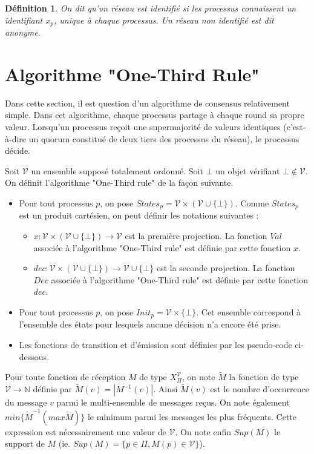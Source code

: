 \documentclass{article}
\newtheorem{definition}{Définition}
\begin{document}
\begin{definition}
	On dit qu'un réseau est \textit{identifié} si les processus connaissent un identifiant $x_p$, unique à chaque processus.
	Un réseau non identifié est dit \textit{anonyme}.
\end{definition}

\section{Algorithme "One-Third Rule"}

Dans cette section, il est question d'un algorithme de consensus relativement simple. Dans cet algorithme, chaque processus partage à chaque round sa propre valeur.
Lorsqu'un processus reçoit une supermajorité de valeurs identiques (c'est-à-dire un quorum constitué de deux tiers des processus du réseau), le processus décide.

Soit $\mathcal{V}$ un ensemble supposé totalement ordonné. Soit $\bot$ un objet vérifiant $\bot \notin \mathcal{V}$.
On définit l'algorithme "One-Third rule" de la façon suivante.
\begin{itemize}
	\item Pour tout processus $p$, on pose $States_p = \mathcal{V} \times (\mathcal{V} \cup \{ \bot \})$.
	Comme $States_p$ est un produit cartésien, on peut définir les notations suivantes :
	\begin{itemize}

		\item $x : \mathcal{V} \times (\mathcal{V} \cup \{ \bot \}) \rightarrow \mathcal{V}$ est la première projection.
			La fonction $Val$ associée à l'algorithme "One-Third rule" est définie par cette fonction $x$.
		\item $dec : \mathcal{V} \times (\mathcal{V} \cup \{ \bot \}) \rightarrow \mathcal{V} \cup \{\bot\}$ est la seconde projection.
			La fonction $Dec$ associée à l'algorithme "One-Third rule" est définie par cette fonction $dec$.

	\end{itemize}
\item Pour tout processus $p$, on pose $Init_p = \mathcal{V} \times \{ \bot \}$. Cet ensemble correspond à l'ensemble des états pour lesquels aucune décision n'a encore été prise.
\item Les fonctions de transition et d'émission sont définies par les pseudo-code ci-dessous.
\end{itemize}
Pour toute fonction de réception $M$ de type $X_\Pi^\mathcal{V}$, on note $\widetilde{M}$ la fonction de type $\mathcal{V} \rightarrow \mathds{N}$ définie par $\widetilde{M}(v) = |M^{-1}(v)|$.
Ainsi $\widetilde{M}(v)$ est le nombre d'occurrence du message $v$ parmi le multi-ensemble de messages reçus.
On note également $min \{\widetilde{M}^{-1} (max \widetilde{M})\}$  le minimum parmi les messages les plus fréquents. Cette expression est nécessairement une valeur de $\mathcal{V}$.
On note enfin $Sup(M)$ le support de $M$ (ie. $Sup(M) = \{p \in \Pi, M(p) \in \mathcal{V}\}$). 
\end{document}
